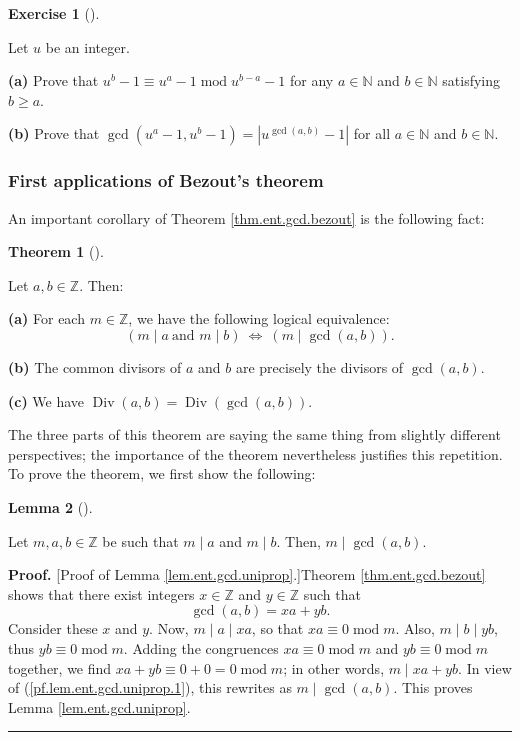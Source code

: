 \documentclass[numbers=enddot,12pt,final,onecolumn,notitlepage]{scrartcl}%
\newcounter{exer}
\numberwithin{exer}{subsection}
\theoremstyle{definition}
\newtheorem{theo}{Theorem}[subsection]
\newenvironment{theorem}[1][]
{\begin{theo}[#1]\begin{leftbar}}
{\end{leftbar}\end{theo}}
\newtheorem{lem}[theo]{Lemma}
\newenvironment{lemma}[1][]
{\begin{lem}[#1]\begin{leftbar}}
{\end{leftbar}\end{lem}}
\newtheorem{exmp}[exer]{Exercise}
\newenvironment{exercise}[1][]
{\begin{exmp}[#1]\begin{leftbar}}
{\end{leftbar}\end{exmp}}
\newenvironment{proof}[1][Proof]{\noindent\textbf{#1.} }{\ \rule{0.5em}{0.5em}}
\begin{document}
\begin{exercise}
\label{exe.ent.gcd.an-1}Let $u$ be an integer.

\textbf{(a)} Prove that $u^{b}-1\equiv u^{a}-1\operatorname{mod}u^{b-a}-1$ for
any $a\in\mathbb{N}$ and $b\in\mathbb{N}$ satisfying $b\geq a$.

\textbf{(b)} Prove that $\gcd\left(  u^{a}-1,u^{b}-1\right)  =\left\vert
u^{\gcd\left(  a,b\right)  }-1\right\vert $ for all $a\in\mathbb{N}$ and
$b\in\mathbb{N}$.
\end{exercise}

\subsubsection{First applications of Bezout's theorem}

An important corollary of Theorem \ref{thm.ent.gcd.bezout} is the following fact:

\begin{theorem}
\label{thm.ent.gcd.uniprop}Let $a,b\in\mathbb{Z}$. Then:

\textbf{(a)} For each $m\in\mathbb{Z}$, we have the following logical
equivalence:%
\begin{equation}
\left(  m\mid a\ \text{and }m\mid b\right)  \ \Longleftrightarrow\ \left(
m\mid\gcd\left(  a,b\right)  \right)  . \label{eq.thm.ent.gcd.uniprop.equiv}%
\end{equation}


\textbf{(b)} The common divisors of $a$ and $b$ are precisely the divisors of
$\gcd\left(  a,b\right)  $.

\textbf{(c)} We have $\operatorname*{Div}\left(  a,b\right)
=\operatorname*{Div}\left(  \gcd\left(  a,b\right)  \right)  $.
\end{theorem}

The three parts of this theorem are saying the same thing from slightly
different perspectives; the importance of the theorem nevertheless justifies
this repetition. To prove the theorem, we first show the following:

\begin{lemma}
\label{lem.ent.gcd.uniprop}Let $m,a,b\in\mathbb{Z}$ be such that $m\mid a$ and
$m\mid b$. Then, $m\mid\gcd\left(  a,b\right)  $.
\end{lemma}

\begin{proof}
[Proof of Lemma \ref{lem.ent.gcd.uniprop}.]Theorem \ref{thm.ent.gcd.bezout}
shows that there exist integers $x\in\mathbb{Z}$ and $y\in\mathbb{Z}$ such
that%
\begin{equation}
\gcd\left(  a,b\right)  =xa+yb. \label{pf.lem.ent.gcd.uniprop.1}%
\end{equation}
Consider these $x$ and $y$. Now, $m\mid a\mid xa$, so that $xa\equiv
0\operatorname{mod}m$. Also, $m\mid b\mid yb$, thus $yb\equiv
0\operatorname{mod}m$. Adding the congruences $xa\equiv0\operatorname{mod}m$
and $yb\equiv0\operatorname{mod}m$ together, we find $xa+yb\equiv
0+0=0\operatorname{mod}m$; in other words, $m\mid xa+yb$. In view of
(\ref{pf.lem.ent.gcd.uniprop.1}), this rewrites as $m\mid\gcd\left(
a,b\right)  $. This proves Lemma \ref{lem.ent.gcd.uniprop}.
\end{proof}
\end{document}
